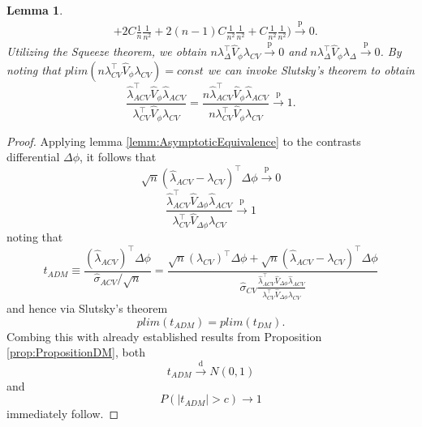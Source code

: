 \documentclass[11pt,dvipsnames]{article}
\newtheorem{proof}{Proof of Proposition}
\newtheorem{lemma}{Lemma}
\begin{document}
\begin{appendices}
\begin{lemma}
\begin{equation}
\begin{split}
&+2C \frac{1}{n}\frac{1}{n^{2}} + 
2(n-1)C \frac{1}{n^{2}}\frac{1}{n^{2}} + 
C \frac{1}{n^{2}}\frac{1}{n^{2}} 
) \overset{\mathrm{p}}{\longrightarrow} 0.
\end{split}
\end{equation}
Utilizing the Squeeze theorem, we obtain $ n\lambda_{\Delta}^{\top} \widehat{V}_{\phi} \lambda_{CV} \overset{\mathrm{p}}{\longrightarrow} 0$ and $ n\lambda_{\Delta}^{\top} \widehat{V}_{\phi} \lambda_{\Delta} \overset{\mathrm{p}}{\longrightarrow} 0$.
By noting that $ plim(n\lambda_{CV}^{\top} \widehat{V}_{\phi} \lambda_{CV})=const $
we can invoke Slutsky's theorem to obtain
\begin{equation}
\frac{\widehat{\lambda}_{ACV}^{\top} \widehat{V}_{\phi} \widehat{\lambda}_{ACV}}{\lambda_{CV}^{\top} \widehat{V}_{\phi} \lambda_{CV}}=\frac{n\widehat{\lambda}_{ACV}^{\top} \widehat{V}_{\phi} \widehat{\lambda}_{ACV}}{n\lambda_{CV}^{\top} \widehat{V}_{\phi} \lambda_{CV}} \overset{\mathrm{p}}{\longrightarrow} 1.
\end{equation}
\end{lemma}



\begin{proof}
Applying lemma \ref{lemm:AsymptoticEquivalence} to the contrasts differential $ \Delta \phi $, it follows that 
\begin{equation}
\sqrt{n}(\widehat{\lambda}_{ACV}-\lambda_{CV})^{\top} \Delta\phi \overset{\mathrm{p}}{\longrightarrow} 0
\end{equation}
\begin{equation}
\frac{\widehat{\lambda}_{ACV}^{\top} \widehat{V}_{\Delta\phi} \widehat{\lambda}_{ACV}}{\lambda_{CV}^{\top} \widehat{V}_{\Delta\phi} \lambda_{CV}} \overset{\mathrm{p}}{\longrightarrow} 1
\end{equation}
noting that  
\begin{equation}
t_{ADM}\equiv \dfrac{(\widehat{\lambda}_{ACV})^{\top} \Delta\phi}{\widehat{\sigma}_{ACV}/\sqrt{n}}= \dfrac{\sqrt{n}(\lambda_{CV})^{\top} \Delta\phi+\sqrt{n}(\widehat{\lambda}_{ACV}-\lambda_{CV})^{\top} \Delta\phi}{\widehat{\sigma}_{CV} \frac{\widehat{\lambda}_{ACV}^{\top} \widehat{V}_{\Delta\phi} \widehat{\lambda}_{ACV}}{\lambda_{CV}^{\top} \widehat{V}_{\Delta\phi} \lambda_{CV}} }
\end{equation}
and hence via Slutsky's theorem
\begin{equation}
plim(t_{ADM})=plim(t_{DM}).
\end{equation}
Combing this with already established results from Proposition \ref{prop:PropositionDM}, both 
\begin{equation}
t_{ADM}\overset{\mathrm{d}}{\longrightarrow} N(0,1)
\end{equation}
and 
\begin{equation}
P\left( |t_{ADM}|>c\right) \longrightarrow 1
\end{equation} 
immediately follow.
\end{proof}




\end{appendices}
\end{document}
